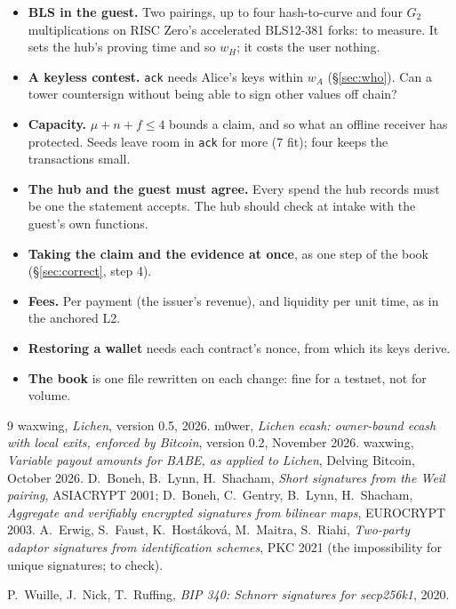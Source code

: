 \documentclass[11pt]{article}
\theoremstyle{plain}
\theoremstyle{definition}
\newcommand{\tx}[1]{\texttt{#1}}
\begin{document}
\begin{itemize}[nosep]
\item \textbf{BLS in the guest.} Two pairings, up to four
  hash-to-curve and four $G_2$ multiplications on RISC Zero's
  accelerated BLS12-381 forks: to measure. It sets the hub's proving
  time and so $w_H$; it costs the user nothing.
\item \textbf{A keyless contest.} \tx{ack} needs Alice's keys within
  $w_A$ (\S\ref{sec:who}). Can a tower countersign without being able
  to sign other values off chain?
\item \textbf{Capacity.} $\mu + n + f \le 4$ bounds a claim, and so what
  an offline receiver has protected. Seeds leave room in \tx{ack} for
  more (7 fit); four keeps the transactions small.
\item \textbf{The hub and the guest must agree.} Every spend the hub
  records must be one the statement accepts. The hub should check at
  intake with the guest's own functions.
\item \textbf{Taking the claim and the evidence at once}, as one step
  of the book (\S\ref{sec:correct}, step 4).
\item \textbf{Fees.} Per payment (the issuer's revenue), and liquidity
  per unit time, as in the anchored L2.
\item \textbf{Restoring a wallet} needs each contract's nonce, from
  which its keys derive.
\item \textbf{The book} is one file rewritten on each change: fine for a
  testnet, not for volume.
\end{itemize}

\begin{thebibliography}{9}
 waxwing, \emph{Lichen}, version 0.5, 2026.
 m0wer, \emph{Lichen ecash: owner-bound ecash with local
  exits, enforced by Bitcoin}, version 0.2, November 2026.
 waxwing, \emph{Variable payout amounts for BABE, as
  applied to Lichen}, Delving Bitcoin, October 2026.
 D.~Boneh, B.~Lynn, H.~Shacham, \emph{Short signatures from
  the Weil pairing}, ASIACRYPT 2001; D.~Boneh, C.~Gentry, B.~Lynn,
  H.~Shacham, \emph{Aggregate and verifiably encrypted signatures from
  bilinear maps}, EUROCRYPT 2003.
 A.~Erwig, S.~Faust, K.~Hostáková, M.~Maitra, S.~Riahi,
  \emph{Two-party adaptor signatures from identification schemes}, PKC
  2021 (the impossibility for unique signatures; to check).

 P.~Wuille, J.~Nick, T.~Ruffing, \emph{BIP 340: Schnorr
  signatures for secp256k1}, 2020.
\end{thebibliography}
\end{document}
